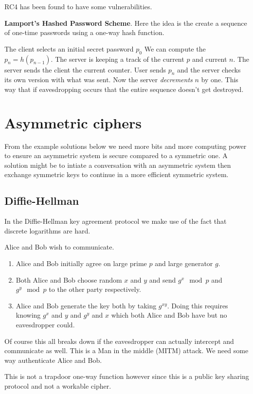 \documentclass{report}
\begin{document}
RC4 has been found to have some vulnerabilities.

\textbf{Lamport's Hashed Password Scheme}. Here
the idea is the create a sequence of one-time passwords using a one-way hash
function.

The client selects an initial secret password $p_0$
We can compute the $p_n = h(p_{n-1})$.
The server is keeping a track of the current $p$ and current $n$.
The server sends the client the current counter.
User sends $p_n$ and the server checks its own version with what was sent.
Now the server \textit{decrements} $n$ by one.
This way that if eavesdropping occurs
that the entire sequence doesn't get destroyed.

\section{Asymmetric ciphers}
From the example solutions below we need more bits and more computing power to
ensure an asymmetric system is secure compared to a symmetric one. A solution
might be to intiate a conversation with an asymmetric system then exchange
symmetric keys to continue in a more efficient symmetric system.

\subsection{Diffie-Hellman}
In the Diffie-Hellman key agreement protocol we make use of the fact that
discrete logarithms are hard.

Alice and Bob wish to communicate.
\begin{enumerate}
    \item Alice and Bob initially agree on large prime $p$ and
        large generator $g$.
    \item Both Alice and Bob choose random $x$ and $y$ and send
        $g^x \mod p$ and $g^y \mod p$
        to the other party respectively.
    \item Alice and Bob generate the key both by taking $g^{xy}$.
        Doing this requires
        knowing $g^x$ and $y$ and $g^y$ and $x$ which both Alice and Bob have
        but no
        eavesdropper could.
\end{enumerate}

Of course this all breaks down if the eavesdropper can actually intercept and
communicate as well. This is a Man in the middle (MITM) attack. We need some way
authenticate Alice and Bob.

This is not a trapdoor one-way function however since this is a public key
sharing protocol and not a workable cipher.
\end{document}

